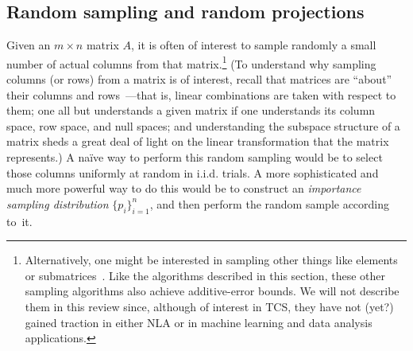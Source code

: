 \documentclass[twoside]{article}
\begin{document}
\subsection{Random sampling and random projections}
\label{sxn:background2:misc-stuff}

Given an $m \times n$ matrix $A$, it is often of interest to sample 
randomly a small number of actual columns 
from that matrix.\footnote{Alternatively, one might be interested in sampling other things 
like elements~\cite{AM07_JRNL} or submatrices~\cite{FK99}.  Like the 
algorithms described in this section, these other sampling algorithms also 
achieve additive-error bounds.  We will not describe them in this review 
since, although of interest in TCS, they have not (yet?) gained traction in 
either NLA or in machine learning and data analysis applications.}
(To understand why sampling columns (or rows) from a matrix is of interest, 
recall that matrices are ``about'' their columns and 
rows~\cite{Strang88}---that is, linear combinations 
are taken with respect to them; one all but understands a given matrix if one 
understands its column space, row space, and null spaces; and understanding 
the subspace structure of a matrix sheds a great deal of light on the linear 
transformation that the matrix represents.)
A na\"{i}ve way to perform this random sampling would be to select 
those columns uniformly at random in i.i.d. trials.
A more sophisticated and much more powerful way to do this would be to 
construct an \emph{importance sampling distribution} $\{p_i\}_{i=1}^{n}$, 
and then perform the random sample according to~it.
\end{document}
